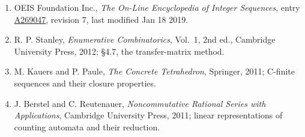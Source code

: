 \documentclass[11pt]{article}
\theoremstyle{definition}
\begin{document}
\begin{enumerate}

\item OEIS Foundation Inc., \emph{The On-Line Encyclopedia of Integer Sequences}, entry \href{https://oeis.org/A269047}{A269047}, revision 7, last modified Jan 18 2019.

\item R. P. Stanley, \emph{Enumerative Combinatorics}, Vol.~1, 2nd ed., Cambridge University Press, 2012; \S4.7, the transfer-matrix method.

\item M. Kauers and P. Paule, \emph{The Concrete Tetrahedron}, Springer, 2011; C-finite sequences and their closure properties.

\item J. Berstel and C. Reutenauer, \emph{Noncommutative Rational Series with Applications}, Cambridge University Press, 2011; linear representations of counting automata and their reduction.

\end{enumerate}
\end{document}
